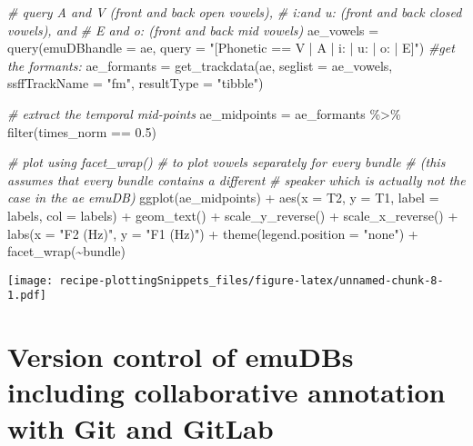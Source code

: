 \documentclass[
]{book}
\newenvironment{Shaded}{\begin{snugshade}}{\end{snugshade}}
\newcommand{\AttributeTok}[1]{\textcolor[rgb]{0.77,0.63,0.00}{#1}}
\newcommand{\CommentTok}[1]{\textcolor[rgb]{0.56,0.35,0.01}{\textit{#1}}}
\newcommand{\FloatTok}[1]{\textcolor[rgb]{0.00,0.00,0.81}{#1}}
\newcommand{\FunctionTok}[1]{\textcolor[rgb]{0.00,0.00,0.00}{#1}}
\newcommand{\NormalTok}[1]{#1}
\newcommand{\OtherTok}[1]{\textcolor[rgb]{0.56,0.35,0.01}{#1}}
\newcommand{\SpecialCharTok}[1]{\textcolor[rgb]{0.00,0.00,0.00}{#1}}
\newcommand{\StringTok}[1]{\textcolor[rgb]{0.31,0.60,0.02}{#1}}
\begin{document}
\begin{Shaded}
\begin{Highlighting}[]
\CommentTok{\# query A and V (front and back open vowels),}
\CommentTok{\# i:and u: (front and back closed vowels), and}
\CommentTok{\# E and o: (front and back mid vowels)}
\NormalTok{ae\_vowels }\OtherTok{=} \FunctionTok{query}\NormalTok{(}\AttributeTok{emuDBhandle =}\NormalTok{ ae,}
                  \AttributeTok{query =} \StringTok{"[Phonetic == V | A | i: | u: | o: | E]"}\NormalTok{)}
\CommentTok{\#get the formants:}
\NormalTok{ae\_formants }\OtherTok{=} \FunctionTok{get\_trackdata}\NormalTok{(ae, }
                            \AttributeTok{seglist =}\NormalTok{ ae\_vowels,}
                            \AttributeTok{ssffTrackName =} \StringTok{"fm"}\NormalTok{,}
                            \AttributeTok{resultType =} \StringTok{"tibble"}\NormalTok{)}

\CommentTok{\# extract the temporal mid{-}points}
\NormalTok{ae\_midpoints }\OtherTok{=}\NormalTok{ ae\_formants }\SpecialCharTok{\%\textgreater{}\%} 
  \FunctionTok{filter}\NormalTok{(times\_norm }\SpecialCharTok{==} \FloatTok{0.5}\NormalTok{)}

\CommentTok{\# plot using facet\_wrap()}
\CommentTok{\# to plot vowels separately for every bundle }
\CommentTok{\# (this assumes that every bundle contains a different}
\CommentTok{\# speaker which is actually not the case in the ae emuDB)}
\FunctionTok{ggplot}\NormalTok{(ae\_midpoints) }\SpecialCharTok{+}
  \FunctionTok{aes}\NormalTok{(}\AttributeTok{x =}\NormalTok{ T2, }\AttributeTok{y =}\NormalTok{ T1, }\AttributeTok{label =}\NormalTok{ labels, }\AttributeTok{col =}\NormalTok{ labels) }\SpecialCharTok{+}
  \FunctionTok{geom\_text}\NormalTok{() }\SpecialCharTok{+}
  \FunctionTok{scale\_y\_reverse}\NormalTok{() }\SpecialCharTok{+} \FunctionTok{scale\_x\_reverse}\NormalTok{() }\SpecialCharTok{+} 
  \FunctionTok{labs}\NormalTok{(}\AttributeTok{x =} \StringTok{"F2 (Hz)"}\NormalTok{, }\AttributeTok{y =} \StringTok{"F1 (Hz)"}\NormalTok{) }\SpecialCharTok{+}
  \FunctionTok{theme}\NormalTok{(}\AttributeTok{legend.position =} \StringTok{"none"}\NormalTok{) }\SpecialCharTok{+} 
  \FunctionTok{facet\_wrap}\NormalTok{(}\SpecialCharTok{\textasciitilde{}}\NormalTok{bundle) }
\end{Highlighting}
\end{Shaded}

\texttt{[image: recipe-plottingSnippets\_files/figure-latex/unnamed-chunk-8-1.pdf]}

\hypertarget{version-control-of-emudbs-including-collaborative-annotation-with-git-and-gitlab}{%
\chapter{Version control of emuDBs including collaborative annotation with Git and GitLab}\label{version-control-of-emudbs-including-collaborative-annotation-with-git-and-gitlab}}
\end{document}
